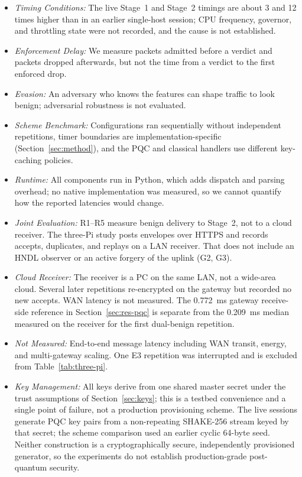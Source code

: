 \documentclass[journal]{IEEEtran}
\begin{document}
\begin{itemize}
  \item \textit{Timing Conditions:} The live Stage~1 and Stage~2 timings are about 3 and 12 times higher than in an earlier single-host session; CPU frequency, governor, and throttling state were not recorded, and the cause is not established.
  \item \textit{Enforcement Delay:} We measure packets admitted before a verdict and packets dropped afterwards, but not the time from a verdict to the first enforced drop.
  \item \textit{Evasion:} An adversary who knows the features can shape traffic to look benign; adversarial robustness is not evaluated.
  \item \textit{Scheme Benchmark:} Configurations ran sequentially without independent repetitions, timer boundaries are implementation-specific (Section~\ref{sec:method}), and the PQC and classical handlers use different key-caching policies.
  \item \textit{Runtime:} All components run in Python, which adds dispatch and parsing overhead; no native implementation was measured, so we cannot quantify how the reported latencies would change.
  \item \textit{Joint Evaluation:} R1--R5 measure benign delivery to Stage~2, not to a cloud receiver. The three-Pi study posts envelopes over HTTPS and records accepts, duplicates, and replays on a LAN receiver. That does not include an HNDL observer or an active forgery of the uplink (G2, G3).
  \item \textit{Cloud Receiver:} The receiver is a PC on the same LAN, not a wide-area cloud. Several later repetitions re-encrypted on the gateway but recorded no new accepts. WAN latency is not measured. The 0.772~ms gateway receive-side reference in Section~\ref{sec:res-pqc} is separate from the 0.209~ms median measured on the receiver for the first dual-benign repetition.
  \item \textit{Not Measured:} End-to-end message latency including WAN transit, energy, and multi-gateway scaling. One E3 repetition was interrupted and is excluded from Table~\ref{tab:three-pi}.
  \item \textit{Key Management:} All keys derive from one shared master secret under the trust assumptions of Section~\ref{sec:keys}; this is a testbed convenience and a single point of failure, not a production provisioning scheme. The live sessions generate PQC key pairs from a non-repeating SHAKE-256 stream keyed by that secret; the scheme comparison used an earlier cyclic 64-byte seed. Neither construction is a cryptographically secure, independently provisioned generator, so the experiments do not establish production-grade post-quantum security.
\end{itemize}
\end{document}
